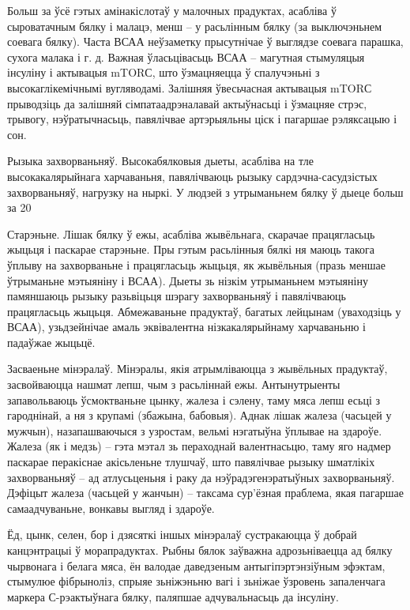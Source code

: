 Больш за ўсё гэтых амінакіслотаў у малочных прадуктах, асабліва ў сыроватачным бялку і малацэ, менш – у расьлінным бялку (за выключэньнем соевага бялку). Часта ВСАА неўзаметку прысутнічае ў выглядзе соевага парашка, сухога малака і г. д. Важная ўласьцівасьць ВСАА – магутная стымуляцыя інсуліну і актывацыя mTORС, што ўзмацняецца ў спалучэньні з высокаглікемічнымі вугляводамі. Залішняя ўвесьчасная актывацыя mTORС прыводзіць да залішняй сімпатаадрэналавай актыўнасьці і ўзмацняе стрэс, трывогу, нэўратычнасьць, павялічвае артэрыяльны ціск і пагаршае рэляксацыю і сон.

Рызыка захворваньняў.
Высокабялковыя дыеты, асабліва на тле высокакалярыйнага харчаваньня, павялічваюць рызыку сардэчна-сасудзістых захворваньняў, нагрузку на ныркі. У людзей з утрыманьнем бялку ў дыеце больш за 20%

Старэньне.
Лішак бялку ў ежы, асабліва жывёльнага, скарачае працягласьць жыцьця і паскарае старэньне. Пры гэтым расьлінныя бялкі ня маюць такога ўплыву на захворваньне і працягласьць жыцьця, як жывёльныя (празь меншае ўтрыманьне мэтыяніну і ВСАА). Дыеты зь нізкім утрыманьнем мэтыяніну памяншаюць рызыку разьвіцьця шэрагу захворваньняў і павялічваюць працягласьць жыцьця. Абмежаваньне прадуктаў, багатых лейцынам (уваходзіць у ВСАА), узьдзейнічае амаль эквівалентна нізкакалярыйнаму харчаваньню і падаўжае жыцьцё.

Засваеньне мінэралаў.
Мінэралы, якія атрымліваюцца з жывёльных прадуктаў, засвойваюцца нашмат лепш, чым з расьліннай ежы. Антынутрыенты запавольваюць ўсмоктваньне цынку, жалеза і сэлену, таму мяса лепш есьці з гароднінай, а ня з крупамі (збажына, бабовыя). Аднак лішак жалеза (часьцей у мужчын), назапашваючыся з узростам, вельмі нэгатыўна ўплывае на здароўе. Жалеза (як і медзь) – гэта мэтал зь пераходнай валентнасьцю, таму яго надмер паскарае перакіснае акісьленьне тлушчаў, што павялічвае рызыку шматлікіх захворваньняў – ад атлусьценьня і раку да нэўрадэгенэратыўных захворваньняў. Дэфіцыт жалеза (часьцей у жанчын) – таксама сур'ёзная праблема, якая пагаршае самаадчуваньне, вонкавы выгляд і здароўе.

Ёд, цынк, селен, бор і дзясяткі іншых мінэралаў сустракаюцца ў добрай канцэнтрацыі ў морапрадуктах. Рыбны бялок заўважна адрозьніваецца ад бялку чырвонага і белага мяса, ён валодае даведзеным антыгіпэртэнзіўным эфэктам, стымулюе фібрыноліз, спрыяе зьніжэньню вагі і зьніжае ўзровень запаленчага маркера С-рэактыўнага бялку, паляпшае адчувальнасьць да інсуліну.

